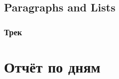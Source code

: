 \documentclass[
11pt, %
]{beamer}
\begin{document}
	
	\subsection{Paragraphs and Lists}
	
	\begin{frame}
		\frametitle{Трек}
		
	\end{frame}
	
	\section{Отчёт по дням}
	
\end{document}
